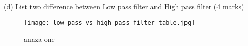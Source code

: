 \documentclass[article]{article}
\begin{document}
\subsection*{}(d) List two difference between Low pass filter and High pass filter (4 marks)
\begin{figure}
    \centering
    \texttt{[image: low-pass-vs-high-pass-filter-table.jpg]}
    \caption{anaza one}
    \label{fig:enter-label}
\end{figure}
\newpage
\end{document}
